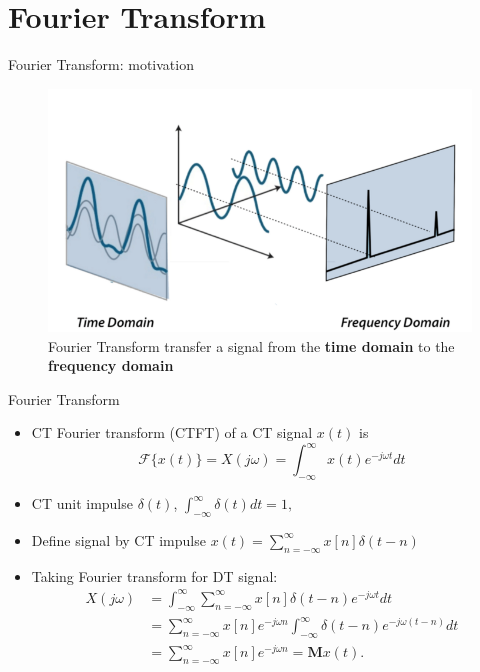 \section{Fourier Transform}
\begin{frame}{Fourier Transform: motivation}
	\begin{figure}
		\centering
		\includegraphics[width=0.8\linewidth]{figs/signal_decomposition.png}
		\caption{Fourier Transform transfer a signal from the \textbf{time domain} to the \textbf{frequency domain}}
	\end{figure}
\end{frame}
\begin{frame}{Fourier Transform}
	\begin{itemize}
		\item CT Fourier transform (CTFT) of a CT signal $x(t)$ is $$\mathcal{F}\{x(t)\}=X(j \omega)=\int_{-\infty}^{\infty} x(t) e^{-j \omega t} d t$$
		\item CT unit impulse $\delta(t)$, $\int_{-\infty}^{\infty} \delta(t) d t=1,$
		\item Define signal by CT impulse $x(t)=\sum_{n=-\infty}^{\infty} x[n] \delta(t-n)$
		\item 	Taking Fourier transform for DT signal: 
		$$
		\begin{aligned}
		X(j \omega) &=\int_{-\infty}^{\infty} \sum_{n=-\infty}^{\infty} x[n] \delta(t-n) e^{-j \omega t} d t \\
		&=\sum_{n=-\infty}^{\infty} x[n] e^{-j \omega n} \int_{-\infty}^{\infty} \delta(t-n) e^{-j \omega (t-n)}d t \\
		&=\sum_{n=-\infty}^{\infty} x[n] e^{-j \omega n} = \mathbf{M} x(t).
		\end{aligned}$$
	\end{itemize}
\end{frame}

